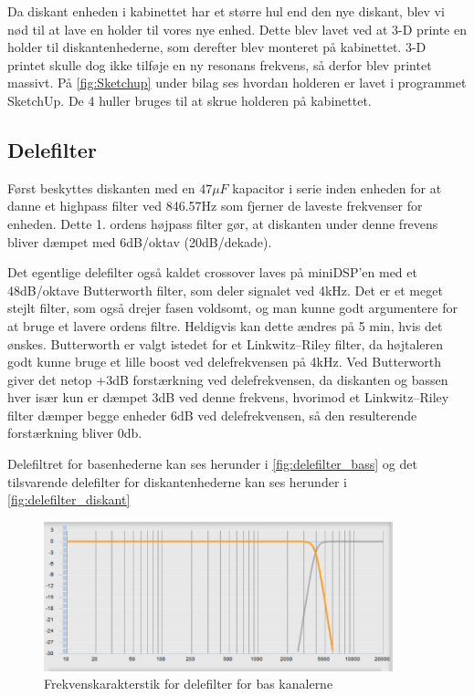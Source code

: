 Da diskant enheden i kabinettet har et større hul end den nye diskant, blev vi nød til at lave en holder til vores nye enhed. Dette blev lavet ved at 3-D printe en holder til diskantenhederne, som derefter blev monteret på kabinettet. 3-D printet skulle dog ikke tilføje en ny resonans frekvens, så derfor blev printet massivt. På \autoref{fig:Sketchup} under bilag ses hvordan holderen er lavet i programmet SketchUp. De 4 huller bruges til at skrue holderen på kabinettet. 

\subsection{Delefilter}
Først beskyttes diskanten med en $47\mu F$ kapacitor i serie inden enheden for at danne et highpass filter ved 846.57Hz som fjerner de laveste frekvenser for enheden. Dette 1. ordens højpass filter gør, at diskanten under denne frevens bliver dæmpet med 6dB/oktav (20dB/dekade). 

Det egentlige delefilter også kaldet crossover laves på miniDSP'en med et 48dB/oktave Butterworth filter, som deler signalet ved 4kHz. Det er et meget stejlt filter, som også drejer fasen voldsomt, og man kunne godt argumentere for at bruge et lavere ordens filtre. Heldigvis kan dette ændres på 5 min, hvis det ønskes. Butterworth er valgt istedet for et Linkwitz–Riley filter, da højtaleren godt kunne bruge et lille boost ved delefrekvensen på 4kHz. Ved Butterworth giver det netop +3dB forstærkning ved delefrekvensen, da diskanten og bassen hver især kun er dæmpet 3dB ved denne frekvens, hvorimod et Linkwitz–Riley filter dæmper begge enheder 6dB ved delefrekvensen, så den resulterende forstærkning bliver 0db.  

Delefiltret for basenhederne kan ses herunder i \autoref{fig:delefilter_bass} og det tilsvarende delefilter for diskantenhederne kan ses herunder i \autoref{fig:delefilter_diskant}
\begin{figure}[H]
	\center
	\includegraphics[width=0.9\textwidth]{figur/delefilter_bass}
	\caption{Frekvenskarakterstik for delefilter for bas kanalerne }
	\label{fig:delefilter_bass}
\end{figure}

